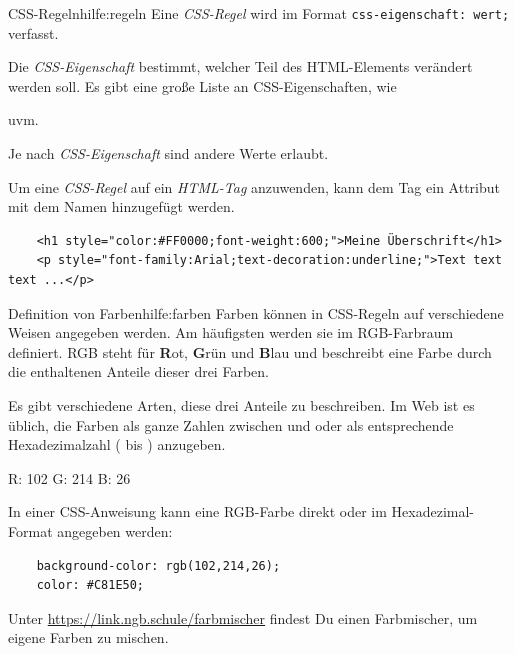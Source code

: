 \documentclass[lerntheke,12pt,a5paper,landscape]{arbeitsblatt}
\begin{document}
\begin{hilfekarte}{CSS-Regeln}{hilfe:regeln}
	Eine \emph{CSS-Regel} wird im Format \texttt{css-eigenschaft: wert;} verfasst.

	Die \emph{CSS-Eigenschaft} bestimmt, welcher Teil des HTML-Elements verändert werden soll. Es gibt eine große Liste an CSS-Eigenschaften, wie
	\begin{smallitem}
		\item {}
		\item {}
		\item {}
		\item {}
		\item uvm.
	\end{smallitem}

	Je nach \emph{CSS-Eigenschaft} sind andere Werte erlaubt.
\end{hilfekarte}

\begin{loesungskarte}
	Um eine \emph{CSS-Regel} auf ein \emph{HTML-Tag} anzuwenden, kann dem Tag ein Attribut mit dem Namen  hinzugefügt werden.

	\begin{verbatim}
	<h1 style="color:#FF0000;font-weight:600;">Meine Überschrift</h1>
	<p style="font-family:Arial;text-decoration:underline;">Text text text ...</p>
	\end{verbatim}
\end{loesungskarte}

\begin{hilfekarte}{Definition von Farben}{hilfe:farben}
	Farben können in CSS-Regeln auf verschiedene Weisen angegeben werden. Am häufigsten werden sie im RGB-Farbraum definiert. RGB steht für \textbf{R}ot, \textbf{G}rün und \textbf{B}lau und beschreibt eine Farbe durch die enthaltenen Anteile dieser drei Farben.

	Es gibt verschiedene Arten, diese drei Anteile zu beschreiben. Im Web ist es üblich, die Farben als ganze Zahlen zwischen  und  oder als entsprechende Hexadezimalzahl ( bis ) anzugeben.

	\begin{center}
		\colorbox[RGB]{102,214,26}{R: 102 G: 214 B: 26} \qquad \colorbox[RGB]{200,30,80}{\textcolor{white}{R: 200 G: 30 B: 80}} \qquad \colorbox[RGB]{50,98,200}{\textcolor{white}{R: 50 G: 98 B: 200}}
	\end{center}

	In einer CSS-Anweisung kann eine RGB-Farbe direkt oder im Hexadezimal-Format angegeben werden:
	\begin{verbatim}
	background-color: rgb(102,214,26);
	color: #C81E50;
	\end{verbatim}

	Unter \url{https://link.ngb.schule/farbmischer} findest Du einen Farbmischer, um eigene Farben zu mischen.
\end{hilfekarte}
\end{document}
